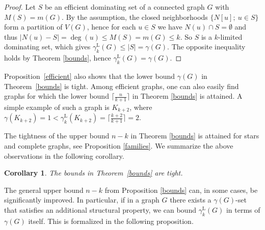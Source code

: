 \documentclass[11pt]{article}
\newtheorem{corollary}[theorem]{Corollary}
\newcommand{\db}[1]{{\color{magenta}#1}}
\newcommand{\gammakL}{\gamma_k^{\mathrm L}}
\begin{document}
\begin{proof}
Let $S$ be an efficient dominating set of a connected graph $G$ with $M(S)=m(G)$. 
By the assumption, the closed neighborhoods $\{N[u];\ u\in S\}$ form a partition of $V(G)$, hence for each $u\in S$ we have $N(u)\cap S=\emptyset$ and thus $|N(u)-S|=\deg(u)\le M(S)=m(G)\le k$. 
So $S$ is a $k$-limited dominating set, which gives $\gammakL(G)\le |S|=\gamma(G)$. The opposite inequality holds
by Theorem \ref{bounds}, hence $\gammakL(G)=\gamma(G)$. 
\end{proof}

Proposition~\ref{efficient} also shows that the lower bound $\gamma(G)$ in Theorem~\ref{bounds} is tight. Among efficient graphs, one can also easily find graphs for which the lower bound 
$\lceil \frac{n}{k+1} \rceil$ 
in Theorem \ref{bounds}
is attained. A simple example of such a graph is $K_{k+2}$, where $\gamma(K_{k+2})=1 < \gammakL(K_{k+2})= \lceil \frac{k+2}{k+1}\rceil=2$.



\medskip
The tightness of the upper bound $n-k$ in Theorem \ref{bounds} is attained for stars and complete graphs, see Proposition \ref{families}. We summarize the above observations in the following corollary.

\begin{corollary}
The bounds in Theorem~\ref{bounds} are tight.
\end{corollary}


The general upper bound $n - k$ from Proposition \ref{bounds} can, in some cases, be significantly improved.  
In particular, if in a graph $G$ there exists a $\gamma(G)$-set that satisfies an additional structural property, we can bound $\gammakL(G)$ in terms of $\gamma(G)$ itself.  
This is formalized in the following proposition.


\end{document}
